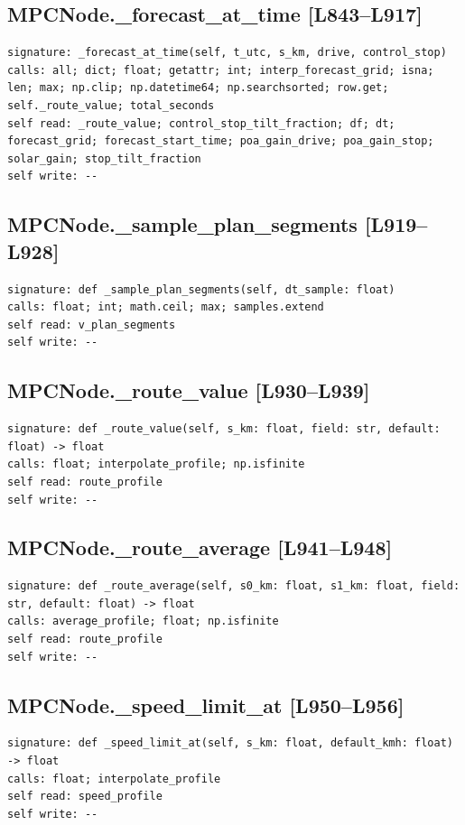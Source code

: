 \documentclass[a4paper,10pt,oneside]{book}
\begin{document}
\subsection*{MPCNode.\_forecast\_at\_time [L843--L917]}
\begin{lstlisting}[numbers=none]
signature: _forecast_at_time(self, t_utc, s_km, drive, control_stop)
calls: all; dict; float; getattr; int; interp_forecast_grid; isna; len; max; np.clip; np.datetime64; np.searchsorted; row.get; self._route_value; total_seconds
self read: _route_value; control_stop_tilt_fraction; df; dt; forecast_grid; forecast_start_time; poa_gain_drive; poa_gain_stop; solar_gain; stop_tilt_fraction
self write: --
\end{lstlisting}
\subsection*{MPCNode.\_sample\_plan\_segments [L919--L928]}
\begin{lstlisting}[numbers=none]
signature: def _sample_plan_segments(self, dt_sample: float)
calls: float; int; math.ceil; max; samples.extend
self read: v_plan_segments
self write: --
\end{lstlisting}
\subsection*{MPCNode.\_route\_value [L930--L939]}
\begin{lstlisting}[numbers=none]
signature: def _route_value(self, s_km: float, field: str, default: float) -> float
calls: float; interpolate_profile; np.isfinite
self read: route_profile
self write: --
\end{lstlisting}
\subsection*{MPCNode.\_route\_average [L941--L948]}
\begin{lstlisting}[numbers=none]
signature: def _route_average(self, s0_km: float, s1_km: float, field: str, default: float) -> float
calls: average_profile; float; np.isfinite
self read: route_profile
self write: --
\end{lstlisting}
\subsection*{MPCNode.\_speed\_limit\_at [L950--L956]}
\begin{lstlisting}[numbers=none]
signature: def _speed_limit_at(self, s_km: float, default_kmh: float) -> float
calls: float; interpolate_profile
self read: speed_profile
self write: --
\end{lstlisting}
\end{document}
